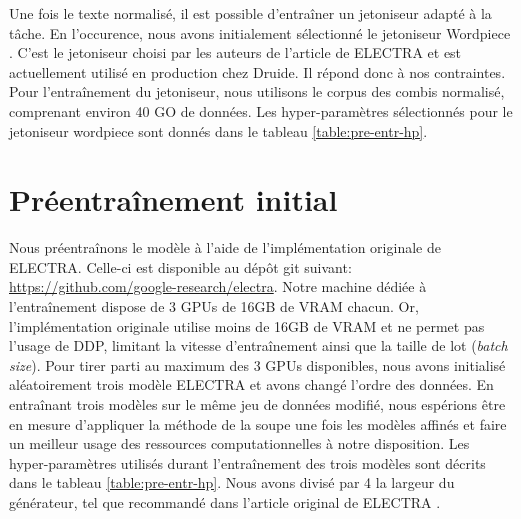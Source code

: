 \documentclass[12pt,twoside,maitrise]{dms}
\theoremstyle{definition}
\numberwithin{equation}{section}
\numberwithin{table}{chapter}
\numberwithin{figure}{chapter}
\begin{document}
Une fois le texte normalisé, il est possible d'entraîner un jetoniseur adapté à
la tâche. En l'occurence, nous avons initialement sélectionné le jetoniseur
Wordpiece \cite{wu2016googlesneuralmachinetranslation}. C'est le jetoniseur
choisi par les auteurs de l'article de ELECTRA et est actuellement utilisé en
production chez Druide. Il répond donc à nos contraintes. Pour l'entraînement
du jetoniseur, nous utilisons le corpus des combis normalisé, comprenant
environ 40 GO de données. Les hyper-paramètres sélectionnés pour le jetoniseur
wordpiece sont donnés dans le tableau \ref{table:pre-entr-hp}.\\

\section{Préentraînement initial}
Nous préentraînons le modèle à l'aide de l'implémentation originale de ELECTRA.
Celle-ci est disponible au dépôt git suivant:
\url{https://github.com/google-research/electra}. Notre machine dédiée à
l'entraînement dispose de 3 GPUs de 16GB de VRAM chacun. Or, l'implémentation
originale utilise moins de 16GB de VRAM et ne permet pas l'usage de DDP,
limitant la vitesse d'entraînement ainsi que la taille de lot (\textit{batch
	size}). Pour tirer parti au maximum des 3 GPUs disponibles, nous avons
initialisé aléatoirement trois modèle ELECTRA et avons changé l'ordre des
données. En entraînant trois modèles sur le même jeu de données modifié, nous
espérions être en mesure d'appliquer la méthode de la soupe \cite{soup} une
fois les modèles affinés et faire un meilleur usage des ressources
computationnelles à notre disposition. Les hyper-paramètres utilisés durant
l'entraînement des trois modèles sont décrits dans le tableau \ref{table:pre-entr-hp}.
Nous avons divisé par 4 la largeur du générateur, tel que recommandé dans
l'article original de ELECTRA \cite{clark2020electrapretrainingtextencoders}.
\end{document}

